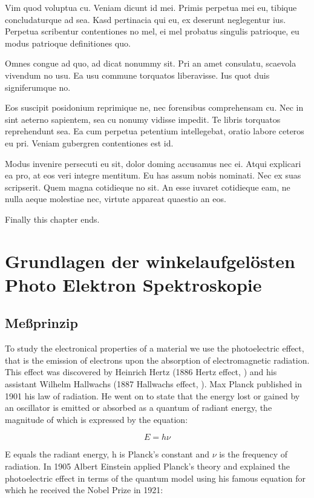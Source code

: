\documentclass[11pt,twoside,german]{book}
\begin{document}
Vim quod voluptua cu. Veniam dicunt id mei. Primis perpetua mei eu, tibique concludaturque ad sea. Kasd pertinacia qui eu, ex deserunt neglegentur ius. Perpetua scribentur contentiones no mel, ei mel probatus singulis patrioque, eu modus patrioque definitiones quo.

Omnes congue ad quo, ad dicat nonummy sit. Pri an amet consulatu, scaevola vivendum no usu. Ea usu commune torquatos liberavisse. Ius quot duis signiferumque no.

Eos suscipit posidonium reprimique ne, nec forensibus comprehensam cu. Nec in sint aeterno sapientem, sea cu nonumy vidisse impedit. Te libris torquatos reprehendunt sea. Ea cum perpetua petentium intellegebat, oratio labore ceteros eu pri. Veniam gubergren contentiones est id.

Modus invenire persecuti eu sit, dolor doming accusamus nec ei. Atqui explicari ea pro, at eos veri integre mentitum. Eu has assum nobis nominati. Nec ex suas scripserit. Quem magna cotidieque no sit. An esse iuvaret cotidieque eam, ne nulla aeque molestiae nec, virtute appareat quaestio an eos.

Finally this chapter ends.

\chapter{Grundlagen der winkelaufgelösten Photo Elektron Spektroskopie}
\section{Meßprinzip}

To study the electronical properties of a material we use the photoelectric effect, that is
the emission of electrons upon the absorption of electromagnetic radiation. This effect was 
discovered by Heinrich Hertz (1886 Hertz effect, \cite{hertz}) and his assistant Wilhelm Hallwachs 
(1887 Hallwachs effect, \cite{hallwachs}). Max Planck published in 1901 his law of radiation. He went on 
to state that the energy lost or gained by an oscillator is emitted or absorbed as a quantum 
of radiant energy, the magnitude of which is expressed by the equation:

\[E=h\nu\]

E equals the radiant energy, h is Planck's constant and $\nu$ is the frequency of radiation. 
In 1905 Albert Einstein applied Planck's theory and explained the photoelectric effect in terms of 
the quantum model using his famous equation for which he received the Nobel Prize in 1921:
\end{document}
